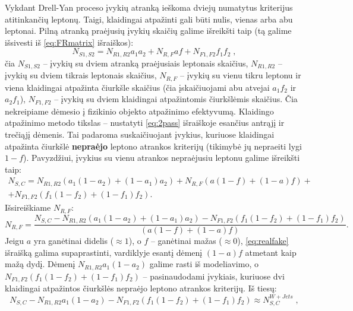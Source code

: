 \documentclass[a4paper, 12pt, oneside]{article}
\newlength\q
\begin{document}
Vykdant Drell-Yan proceso įvykių atranką ieškoma dviejų numatytus kriterijus atitinkančių leptonų.
Taigi, klaidingai atpažinti gali būti nulis, vienas arba abu leptonai.
Pilną atranką praėjusių įvykių skaičių galime išreikšti taip (tą galime išsivesti iš \eqref{eq:FRmatrix} išraiškos):
\begin{equation}
\label{eq:2pass}
	N_{S1,S2} = N_{R1,R2} a_1 a_2 + N_{R,F} af + N_{F1,F2} f_1 f_2 \; ,
\end{equation}
čia $N_{S1,S2}$ -- įvykių su dviem atranką praėjusiais leptonais skaičius, $N_{R1,R2}$ -- įvykių su dviem tikrais
leptonais skaičius, $N_{R,F}$ -- įvykių su vienu tikru leptonu ir viena klaidingai atpažinta čiurkšle skaičius
(čia įskaičiuojami abu atvejai $a_1 f_2$ ir $a_2 f_1$), $N_{F1,F2}$ -- įvykių su dviem klaidingai
atpažintomis čiurkšlėmis skaičius.
Čia nekreipiame dėmesio į fizikinio objekto atpažinimo efektyvumą.
Klaidingo atpažinimo metodo tikslas -- nustatyti \eqref{eq:2pass} išraiškoje esančius antrąjį ir trečiąjį dėmenis.
Tai padaroma suskaičiuojant įvykius, kuriuose klaidingai atpažinta čiurkšlė \textbf{nepraėjo} leptono atrankos kriterijų
(tikimybė jų nepraeiti lygi $1-f$).
Pavyzdžiui, įvykius su vienu atrankos nepraėjusiu leptonu galime išreikšti taip:
\begin{equation}
	\label{eq:1fail}
	\begin{gathered}
		N_{S,C} = N_{R1,R2} \left( a_1(1-a_2) + (1-a_1)a_2 \right) + N_{R,F} \left( a(1-f) + (1-a)f \right) + \\
				  	  + N_{F1,F2} \left( f_1(1-f_2) + (1-f_1)f_2 \right).
	\end{gathered}
\end{equation}
Išsireiškiame $N_{R,F}$:
\begin{equation}
\label{eq:realfake}
	N_{R,F} = \frac{ N_{S,C} - N_{R1,R2} (a_1(1-a_2)+(1-a_1)a_2) - N_{F1,F2} (f_1(1-f_2)+(1-f_1)f_2) }
				   { (a(1-f)+(1-a)f) }.
\end{equation}
Jeigu $a$ yra ganėtinai didelis ($\approx \!1$), o $f$ -- ganėtinai mažas ($\approx \!0$), \eqref{eq:realfake} išraišką galima
supaprastinti, vardiklyje esantį dėmenį $(1-a)f$ atmetant kaip mažą dydį.
Dėmenį $N_{R1,R2} a_1(1-a_2)$ galime rasti iš modeliavimo, o $N_{F1,F2} (f_1(1-f_2)+(1-f_1)f_2)$ -- pasinaudodami
įvykiais, kuriuose dvi klaidingai atpažintos čiurkšlės nepraėjo leptono atrankos kriterijų.
Iš tiesų:
\begin{equation}
\label{eq:FRWjets}
	N_{S,C} - N_{R1,R2} a_1(1-a_2)- N_{F1,F2} (f_1(1-f_2)+(1-f_1)f_2) \approx N_{S,C}^{W+Jets} \; ,
\end{equation}
\end{document}

